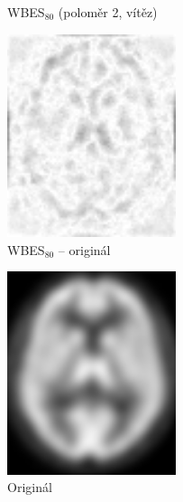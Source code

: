 \begin{figure}[H]
\begin{minipage}[l]{0.5\textwidth}
            \caption{WBES$_{80}$ (poloměr 2, vítěz)}
        \end{minipage}
        \begin{minipage}[r]{0.5\textwidth}
            \center
            \includegraphics[width = 140pt]{src/8Appendix/final/15-50wbesLD.png}
            \caption{WBES$_{80}$ -- originál}
        \end{minipage}
    \end{figure}
    \newpage
    \begin{figure}[H]
        \center
        \begin{minipage}[c]{0.5\textwidth}
            \center
            \includegraphics[width = 140pt]{src/8Appendix/final/original.png}
            \caption{Originál}
        \end{minipage}
    \end{figure}
